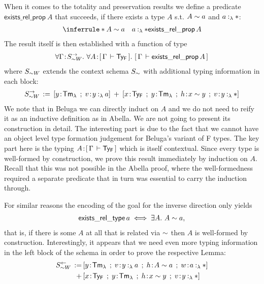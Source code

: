 When it comes to the totality and preservation results we define a predicate $\mathsf{exists\_rel\_prop}~A$ that succeeds, if there exists a type $A$ s.t. $A \mathrel{\sim} a$ and $\typingLh{a}{\Prp}$:
\begin{align*}
\inferrule*{A \tyr a \quad \typingLh{a}{\Prp}}{ \mathsf{exists\_rel\_prop}\,A}
\end{align*}
The result itself is then established with a function of type
\begin{align*}
  \forall \Gamma \!:\! S_{\mathrel{\sim} W}^{\rightarrow}.\,\, \forall A \!:\! [\,\Gamma\,\vdash \mathsf{Ty_{F}}\,].\,\, [\,\Gamma\,\vdash \mathsf{exists\_rel\_prop}\,A\,]
\end{align*}
where $S_{\mathrel{\sim} W}$ extends the context schema $S_{\mathrel{\sim}}$ with additional typing information in each block:
\begin{align*}
  S_{\tyr W}^{\rightarrow} \eqdef [y\of\TmL \mrel{;} v\of\typingLh{y}{a}] \mrel{+} [x\of\TyF \mrel{;} y\of\TmL \mrel{;} h\of x \tyr y \mrel{;} v\of\typingLh{y}{\Prp}]
\end{align*}
%
We note that in Beluga we can directly induct on $A$ and we do not need to reify it as an inductive definition as in Abella. We are not going to present its construction in detail.
The interesting part is due to the fact that we cannot have an object level type formation judgement for Beluga's variant of F types.
The key part here is the typing $A \!:\! [\,\Gamma\,\vdash \mathsf{Ty_{F}}\,]$ which is itself contextual.
Since every type is well-formed by construction, we prove this result immediately by induction on $A$.
Recall that this was not possible in the Abella proof, where the well-formedness required a separate predicate that in turn was essential to carry the induction through.

For similar reasons the encoding of the goal for the inverse direction only yields
\begin{align*}
  \mathsf{exists\_rel\_type}\,a \iff \exists A.\,\, A \mathrel{\sim} a,
\end{align*}
that is, if there is some $A$ at all that is related via $\mathrel{\sim}$ then $A$ is well-formed by construction.
Interestingly, it appears that we need even more typing information in the left block of the schema in order to prove the respective Lemma:
\begin{align*}
  S_{\tyr W}^{\leftarrow} \eqdef &[y\of\TmL \mrel{;} v\of\typingLh{y}{a} \mrel{;} h\of A \tyr a \mrel{;} w \of \typingLh{a}{\Prp}]\\
  \mrel{+} &[x\of\TyF \mrel{;} y\of\TmL \mrel{;} h\of x \tyr y \mrel{;} v\of\typingLh{y}{\Prp}]
\end{align*}

